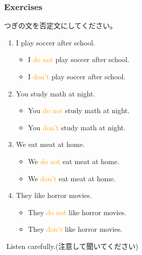 \documentclass[aspectratio=169]{beamer}
\newcommand{\myaudio}[1]{\href{#1}{\faVolumeUp}}
\begin{document}
\begin{frame}[plain]\frametitle{Exercises}
 
つぎの文を否定文にしてください。
\begin{enumerate}
 \item I play soccer after school.\pause{}\hspace{63pt}{\footnotesize after school: 放課後に}\pause
         \begin{itemize}
	 \item I \textcolor{orange}{do not} play soccer after school.\\\pause
	  \item I \textcolor{orange}{don't} play soccer after school.\pause
	\end{itemize}
 \item You study math at night.\pause\hspace{68pt}{\footnotesize study: 勉強する　math: 数学　at night: 夜に}\\\pause
       \begin{itemize}
	\item You \textcolor{orange}{do not} study math at night.\\\pause
	\item You \textcolor{orange}{don't} study math at night.\pause
       \end{itemize}
 \item We eat meat at home.\pause\hspace{80pt}{\footnotesize eat: 食べる　meat: 肉}\\\pause
\begin{itemize}
 \item We \textcolor{orange}{do not} eat meat at home.\\\pause
 \item We \textcolor{orange}{don't} eat meat at home.\pause
\end{itemize}
 \item They like horror movies.\pause\hspace{70pt}{\footnotesize horror movie: ホラー映画}\\\pause
\begin{itemize}
 \item They \textcolor{orange}{do not} like horror movies.\\\pause
 \item They \textcolor{orange}{don't} like horror movies.
\end{itemize}
\end{enumerate}

\myaudio{audio/007_negative_do_01.mp3}\,\,{}Listen carefully.(注意して聞いてください)

\end{frame}
\end{document}

